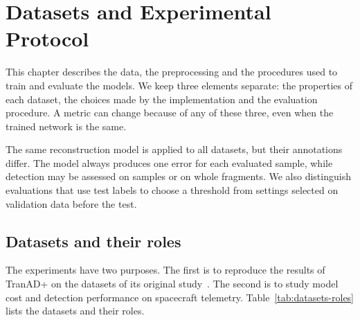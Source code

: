 \chapter{Datasets and Experimental Protocol}
\label{chap:datasets}


This chapter describes the data, the preprocessing and the procedures used
to train and evaluate the models. We keep three elements separate: the
properties of each dataset, the choices made by the implementation and the
evaluation procedure. A metric can change because of any of these three,
even when the trained network is the same.

The same reconstruction model is applied to all datasets, but their
annotations differ. The model always produces one error for each evaluated
sample, while detection may be assessed on samples or on whole fragments.
We also distinguish evaluations that use test labels to choose a threshold
from settings selected on validation data before the test.

\section{Datasets and their roles}
\label{sec:datasets-roles}

The experiments have two purposes. The first is to reproduce the results
of TranAD+ on the datasets of its original study~\cite{Yermakov2025TranADPlus}.
The second is to study model cost and detection performance on spacecraft
telemetry. Table~\ref{tab:datasets-roles} lists the datasets and their roles.

